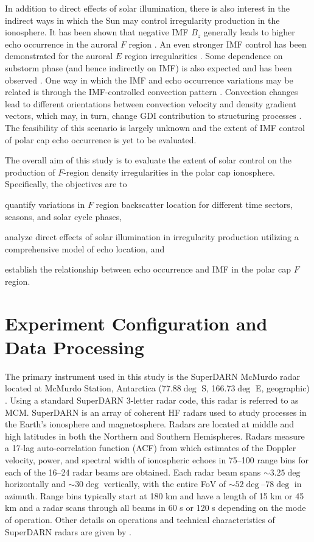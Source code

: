 In addition to direct effects of solar illumination, there is also interest in the indirect ways in which the Sun may control irregularity production in the ionosphere. It has been shown that negative IMF \(B_z\) generally leads to higher echo occurrence in the auroral \(F\) region \citep{Ballatore2001}. An even stronger IMF control has been demonstrated for the auroral \(E\) region irregularities \citep{Makarevich2012}. Some dependence on substorm phase (and hence indirectly on IMF) is also expected and has been observed \citep{Wild2008}. One way in which the IMF and echo occurrence variations may be related is through the IMF-controlled convection pattern \citep{Ruohoniemi1996,Pettigrew2010}. Convection changes lead to different orientations between convection velocity and density gradient vectors, which may, in turn, change GDI contribution to structuring processes \citep{Makarevich2014c}. The feasibility of this scenario is largely unknown and the extent of IMF control of polar cap echo occurrence is yet to be evaluated.

The overall aim of this study is to evaluate the extent of solar control on the production of \(F\)-region density irregularities in the polar cap ionosphere. Specifically, the objectives are to 
\begin{enumerate*}[label={(\arabic*)}]
	\item quantify variations in \(F\) region backscatter location for different time sectors, seasons, and solar cycle phases,
	\item analyze direct effects of solar illumination in irregularity production utilizing a comprehensive model of echo location, and
	\item  establish the relationship between echo occurrence and IMF in the polar cap \(F\) region.
\end{enumerate*}


\section{Experiment Configuration and Data Processing}
\label{sec:p1experiment}

The primary instrument used in this study is the SuperDARN McMurdo radar located at McMurdo Station, Antarctica (77.88\(\deg\) S, 166.73\(\deg\) E, geographic) \citep[Figure 1]{Bristow2011}. Using a standard SuperDARN 3-letter radar code, this radar is referred to as MCM. SuperDARN is an array of coherent HF radars used to study processes in the Earth's ionosphere and magnetosphere. Radars are located at middle and high latitudes in both the Northern and Southern Hemispheres. Radars measure a 17-lag auto-correlation function (ACF) from which estimates of the Doppler velocity, power, and spectral width of ionospheric echoes in 75--100 range bins for each of the 16--24 radar beams are obtained. Each radar beam spans \(\sim3.25\deg\) horizontally and \(\sim30\deg\) vertically, with the entire FoV of \(\sim52\deg\)--\(78\deg\) in azimuth. Range bins typically start at 180 km and have a length of 15 km or 45 km and a radar scans through all beams in 60 s or 120 s depending on the mode of operation. Other details on operations and technical characteristics of SuperDARN radars are given by \citet{Chisham2007}.

